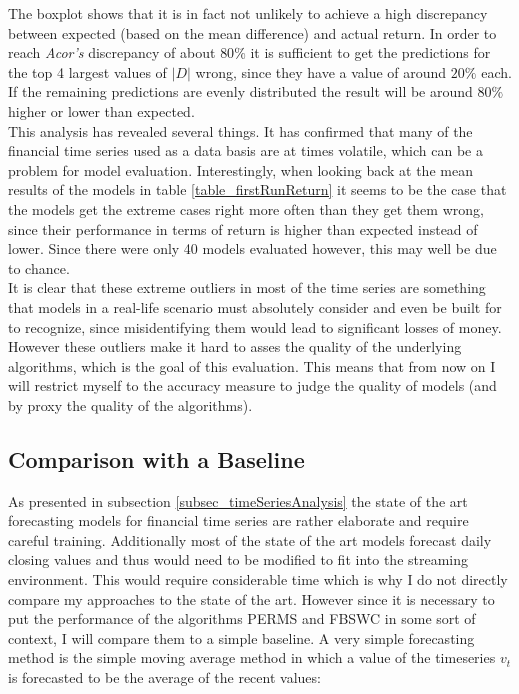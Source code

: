 The boxplot shows that it is in fact not unlikely to achieve a high discrepancy between expected (based on the mean difference) and actual return. In order to reach \textit{Acor's} discrepancy of about $80\%$ it is sufficient to get the predictions for the top 4 largest values of $|D|$ wrong, since they have a value of around $20\%$ each. If the remaining predictions are evenly distributed the result will be around $80\%$ higher or lower than expected. \\
This analysis has revealed several things. It has confirmed that many of the financial time series used as a data basis are at times volatile, which can be a problem for model evaluation. Interestingly, when looking back at the mean results of the models in table \ref{table_firstRunReturn} it seems to be the case that the models get the extreme cases right more often than they get them wrong, since their performance in terms of return is higher than expected instead of lower. Since there were only 40 models evaluated however, this may well be due to chance. \\
It is clear that these extreme outliers in most of the time series are something that models in a real-life scenario must absolutely consider and even be built for to recognize, since misidentifying them would lead to significant losses of money. However these outliers make it hard to asses the quality of the underlying algorithms, which is the goal of this evaluation. This means that from now on I will restrict myself to the accuracy measure to judge the quality of models (and by proxy the quality of the algorithms).

\subsection{Comparison with a Baseline}
As presented in subsection \ref{subsec_timeSeriesAnalysis} the state of the art forecasting models for financial time series are rather elaborate and require careful training. Additionally most of the state of the art models forecast daily closing values and thus would need to be modified to fit into the streaming environment. This would require considerable time which is why I do not directly compare my approaches to the state of the art. However since it is necessary to put the performance of the algorithms PERMS and FBSWC in some sort of context, I will compare them to a simple baseline. A very simple forecasting method is the simple moving average method \cite{makridakis1982accuracy} in which a value of the timeseries $v_t$ is forecasted to be the average of the recent values:

